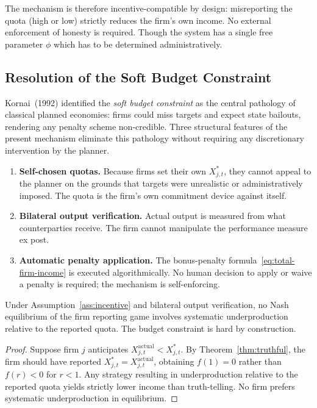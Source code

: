 The mechanism is therefore incentive-compatible by design: misreporting the quota
(high or low) strictly reduces the firm's own income. No external enforcement of
honesty is required. Though the system has a single free parameter $\phi$ which has to be determined administratively.

\subsection{Resolution of the Soft Budget Constraint}\label{sec:soft-budget}

Kornai~(1992) identified the \textit{soft budget constraint} as the central pathology
of classical planned economies: firms could miss targets and expect state bailouts,
rendering any penalty scheme non-credible. Three structural features of the present
mechanism eliminate this pathology without requiring any discretionary intervention by
the planner.

\begin{enumerate}
    \item \textbf{Self-chosen quotas.} Because firms set their own $X_{j,t}^*$,
          they cannot appeal to the planner on the grounds that targets were
          unrealistic or administratively imposed. The quota is the firm's own
          commitment device against itself.
    \item \textbf{Bilateral output verification.} Actual output is measured from
          what counterparties receive. The firm cannot manipulate the performance
          measure ex post.
    \item \textbf{Automatic penalty application.} The bonus-penalty
          formula~\eqref{eq:total-firm-income} is executed algorithmically. No
          human decision to apply or waive a penalty is required; the mechanism
          is self-enforcing.
\end{enumerate}

\begin{proposition}\label{prop:hard-budget}
Under Assumption~\ref{ass:incentive} and bilateral output verification, no Nash
equilibrium of the firm reporting game involves systematic underproduction relative
to the reported quota. The budget constraint is hard by construction.
\end{proposition}

\begin{proof}
Suppose firm $j$ anticipates $X_{j,t}^{\text{actual}} < X_{j,t}^*$. By
Theorem~\ref{thm:truthful}, the firm should have reported $X_{j,t}^* =
X_{j,t}^{\text{actual}}$, obtaining $f(1) = 0$ rather than $f(r) < 0$ for $r < 1$.
Any strategy resulting in underproduction relative to the reported quota yields
strictly lower income than truth-telling. No firm prefers systematic underproduction
in equilibrium.
\end{proof}

